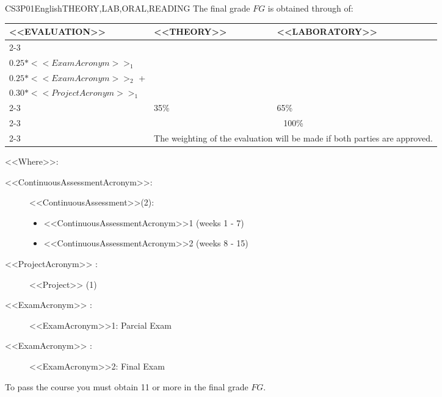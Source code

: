    \begin{evaluation}{CS3P01}{English}{THEORY,LAB,ORAL,READING}
    The final grade $FG$ is obtained through of:
   
    \begin{tabularx}{0.9\textwidth}{|X|p{}|p{}|} \hline
    \multirow{4}{*}{\uppercase{<<Evaluation>>}} & \uppercase{<<Theory>>} & \uppercase{<<Laboratory>>} \\ \cline{2-3}
    & %
        \begin{minipage}{0.95\textwidth}
        \begin{tabular}{l}
          $0.10*<<ContinuousAssessmentAcronym>>_{1}$  + \\
          $0.25*<<ExamAcronym>>_{1}$ 
        \end{tabular} 
        \end{minipage} 
    & %
        \begin{minipage}{0.95\textwidth}
        \begin{tabular}{l}
          $0.10*<<ContinuousAssessmentAcronym>>_{2}$  + \\
          $0.25*<<ExamAcronym>>_{2}$  +  \\
          $0.30*<<ProjectAcronym>>_{1}$
        \end{tabular} 
        \end{minipage}                 \\ \cline{2-3}
    
    & %
    35\% 
    & %
    65\% \\ \cline{2-3}
    & \multicolumn{2}{|c|}{100\%}  \\ \cline{2-3}
    & \multicolumn{2}{|c|}{The weighting of the evaluation will be made if both parties are approved.}  \\ \hline
    \end{tabularx}
     
    \vspace{2mm}
    \noindent <<Where>>:
    \begin{description}
        \item[<<ContinuousAssessmentAcronym>>:]<<ContinuousAssessment>>(2):
        \begin{itemize}
            \item <<ContinuousAssessmentAcronym>>1 (weeks 1 - 7) 
            \item <<ContinuousAssessmentAcronym>>2 (weeks 8 - 15)
        \end{itemize}
        \item[<<ProjectAcronym>> :] <<Project>> (1)
        \item[<<ExamAcronym>> :] <<ExamAcronym>>1: Parcial Exam
        \item[<<ExamAcronym>> :] <<ExamAcronym>>2: Final Exam
    \end{description}
   
    \noindent To pass the course you must obtain 11 or more in the final grade $FG$.
    \end{evaluation}


